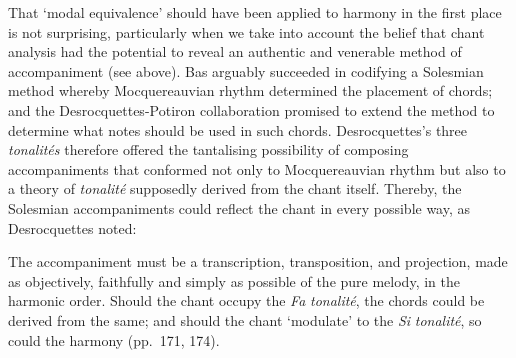 That `modal equivalence' should have been applied to harmony in the first place is not surprising, particularly when we take into account the belief that chant analysis had the potential to reveal an authentic and venerable method of accompaniment (see  above).
Bas arguably succeeded in codifying a Solesmian method whereby Mocquereauvian rhythm determined the placement of chords; and the Desrocquettes-Potiron collaboration promised to extend the method to determine what notes should be used in such chords.
Desrocquettes's three \emph{tonalités} therefore offered the tantalising possibility of composing accompaniments that conformed not only to Mocquereauvian rhythm but also to a theory of \emph{tonalité} supposedly derived from the chant itself.
Thereby, the Solesmian accompaniments could reflect the chant in every possible way, as Desrocquettes noted:

  {\cite[170]{Desrocquettesaccompagnementmelodiegregorienne1923}}
{The accompaniment must be a transcription, transposition, and projection, made as objectively, faithfully and simply as possible of the pure melody, in the harmonic order.}
\noindent
Should the chant occupy the \emph{Fa} \emph{tonalité}, the chords could be derived from the same; and should the chant `modulate' to the \emph{Si}\kern 1pt\flat{} \emph{tonalité}, so could the harmony (pp.~171, 174).

